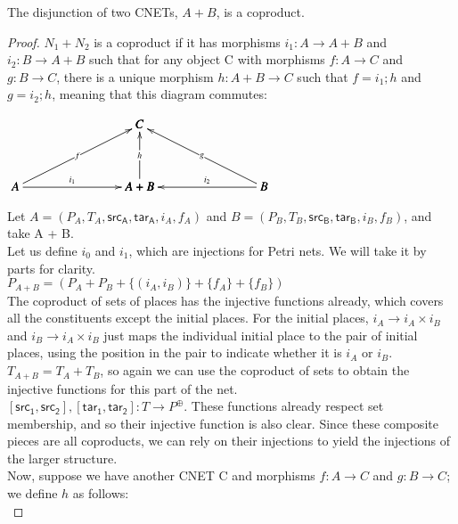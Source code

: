 \begin{lemma}
  \label{lemma:OR-coproduct}
  The disjunction of two CNETs, $A + B$, is a coproduct. 
\end{lemma}
\begin {proof}
$N_1 + N_2$ is a coproduct if it has morphisms $i_1: A \to A + B$ and $i_2: B \to A + B$ such that for any object C with morphisms $f: A\to C$ and $g: B\to C$, there is a unique morphism $h: A + B \to C$ such that $f = i_1;h$ and $g = i_2; h$, meaning that this diagram commutes:\\
\begin{center}
  \begin{math}
    \bfig
    \Atrianglepair|mmmaa|/<-`<-`<-`->`<-/<1000,500>[
      C`
      A`
      A+B`
      B;
      f`
      h`
      g`
      i_1`
      i_2]
    \efig
  \end{math}
\end{center}
Let $A = (P_A, T_A, \mathsf{src_A}, \mathsf{tar_A}, i_A, f_A)$ and $B = (P_B, T_B, \mathsf{src_B}, \mathsf{tar_B}, i_B, f_B)$, and take A + B.\\
Let us define $i_0$ and $i_1$, which are injections for Petri nets. We will take it by parts for clarity.\\
$P_{A+B} = (P_A +P_B+\{(i_A, i_B)\} +\{f_A\} + \{f_B\})$\\
The coproduct of sets of places has the injective functions already, which covers all the constituents except the initial places. For the initial places, $i_A \to i_A \times i_B$ and $i_B \to i_A \times i_B$ just maps the individual initial place to the pair of initial places, using the position in the pair to indicate whether it is $i_A$ or $i_B$.\\
$T_{A+B} = T_A + T_B$, so again we can use the coproduct of sets to obtain the injective functions for this part of the net.\\
 $[\mathsf{src_1}, \mathsf{src_2}], [\mathsf{tar_1}, \mathsf{tar_2}]: T\to P^\oplus$. These functions already respect set membership, and so their injective function is also clear. Since these composite pieces are all coproducts, we can rely on their injections to yield the injections of the larger structure.\smallskip\\ 
Now, suppose we have another CNET C and morphisms $f: A\to C$ and $g: B\to C$; we define $h$ as follows:\\

\end{proof}
